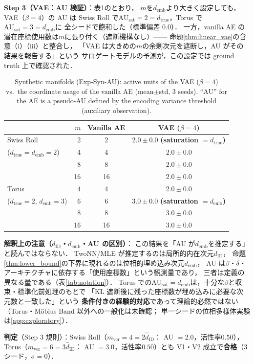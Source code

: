 \documentclass[11pt,a4paper]{jsarticle}
\newcommand{\dID}{d_{\mathrm{ID}}}
\newcommand{\hatdID}{\hat{d}_{\mathrm{ID}}}
\newcommand{\dtrue}{d_{\mathrm{true}}}
\newcommand{\AUsat}{\mathrm{AU}_{\mathrm{sat}}}
\newcommand{\demb}{d_{\mathrm{emb}}}
\begin{document}
\textbf{Step 3（VAE：AU 検証）}：表\ref{tab:ea}のとおり，
$m$を$\demb$より大きく設定しても，VAE（$\beta = 4$）の AU は
Swiss Roll で$\AUsat = 2 = \dtrue$，Torus で$\AUsat = 3 = \demb$に
全シードで飽和した（標準偏差 0.0）．
一方，vanilla AE の潜在座標使用数は$m$に張り付く（遮断機構なし）——
命題\ref{thm:linear_vae}の含意（i）（iii）と整合し，
「VAE は大きめの$m$の余剰次元を遮断し，AU がその結果を報告する」という
サロゲートモデルの予測が，この設定では ground truth 上で確認された．

\begin{table}[H]
\centering
\caption{Synthetic manifolds (Exp-Syn-AU): active units of the VAE
($\beta = 4$) vs.\ the coordinate usage of the vanilla AE
(mean$\pm$std, 3 seeds). ``AU'' for the AE is a pseudo-AU defined by the
encoding variance threshold (auxiliary observation).}
\label{tab:ea}
\small
\begin{tabular}{lrcc}
\toprule
 & $m$ & Vanilla AE & VAE ($\beta = 4$) \\
\midrule
Swiss Roll & 2 & 2 & $2.0 \pm 0.0$ \textbf{(saturation $= \dtrue$)} \\
($\dtrue = \demb = 2$) & 4 & 4 & $2.0 \pm 0.0$ \\
 & 8 & 8 & $2.0 \pm 0.0$ \\
 & 16 & 16 & $2.0 \pm 0.0$ \\
\midrule
Torus & 4 & 4 & $2.0 \pm 0.0$ \\
($\dtrue = 2$, $\demb = 3$) & 6 & 6 & $3.0 \pm 0.0$ \textbf{(saturation $= \demb$)} \\
 & 8 & 8 & $3.0 \pm 0.0$ \\
 & 16 & 16 & $3.0 \pm 0.0$ \\
\bottomrule
\end{tabular}
\end{table}

\textbf{解釈上の注意（$\dID$・$\demb$・AU の区別）}：
この結果を「AU が$\demb$を推定する」と読んではならない．
TwoNN/MLE が推定するのは局所的内在次元$\dID$，
命題\ref{thm:lower_bound}の下界に現れるのは位相的埋め込み次元$\demb$，
AU は$\beta$・$\delta$・アーキテクチャに依存する「使用座標数」という観測量であり，
三者は定義の異なる量である（表\ref{tab:notation}）．
Torus での$\AUsat = \demb$は，十分な$\beta$と収束・標準化前処理のもとで
「KL 遮断後に残った座標数が埋め込みに必要な次元数と一致した」という
\textbf{条件付きの経験的対応}であって理論的必然ではない
（Torus・M\"obius Band 以外への一般化は未確認；
単一シードの位相多様体実験は\ref{app:exploratory}）．

\textbf{判定}（Step 3 規則）：Swiss Roll（$m_{\mathrm{ver}} = 4 = 2\hatdID$：
AU $= 2.0$，活性率$0.50$），Torus（$m_{\mathrm{ver}} = 6 = 3\hatdID$：
AU $= 3.0$，活性率$0.50$）とも V1・V2 成立で\textbf{合格}（3シード，$\sigma = 0$）．
\end{document}

